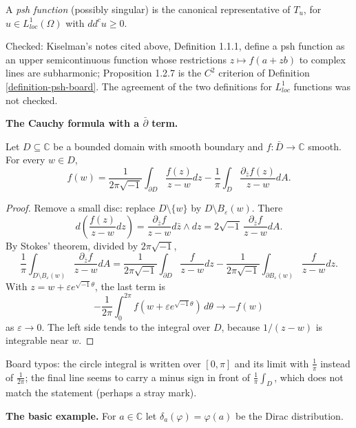 \begin{definition}
\label{definition-singular-psh}
A \emph{psh function} (possibly singular) is
the canonical representative of $T_u$, for
$u\in L^1_{loc}(\Omega)$ with $dd^cu\geq 0$.
\end{definition}

\noindent
Checked: Kiselman's notes cited above,
Definition 1.1.1, define a psh function as
an upper semicontinuous function whose
restrictions $z\mapsto f(a+zb)$ to complex
lines are subharmonic; Proposition 1.2.7 is
the $C^2$ criterion of Definition
\ref{definition-psh-board}. The agreement of
the two definitions for $L^1_{loc}$
functions was not checked.

\medskip\noindent
{\bf The Cauchy formula with a
$\bar\partial$ term.}

\begin{proposition}
\label{proposition-cauchy-pompeiu-board}
Let $D\subseteq\mathbb{C}$ be a bounded
domain with smooth boundary and $f\colon\bar
D\to\mathbb{C}$ smooth. For every $w\in D$,
$$
f(w)=\frac{1}{2\pi\sqrt{-1}}
\int_{\partial D}\frac{f(z)}{z-w}dz
-\frac{1}{\pi}\int_D
\frac{\partial_{\bar z}f(z)}{z-w}dA.
$$
\end{proposition}

\begin{proof}
Remove a small disc: replace
$D\setminus\{w\}$ by
$D\setminus B_\varepsilon(w)$. There
$$
d\left(\frac{f(z)}{z-w}dz\right)
=\frac{\partial_{\bar z}f}{z-w}
d\bar z\wedge dz
=2\sqrt{-1}\,
\frac{\partial_{\bar z}f}{z-w}dA.
$$
By Stokes' theorem, divided by
$2\pi\sqrt{-1}$,
$$
\frac{1}{\pi}
\int_{D\setminus B_\varepsilon(w)}
\frac{\partial_{\bar z}f}{z-w}dA
=\frac{1}{2\pi\sqrt{-1}}
\int_{\partial D}\frac{f}{z-w}dz
-\frac{1}{2\pi\sqrt{-1}}
\int_{\partial B_\varepsilon(w)}
\frac{f}{z-w}dz.
$$
With $z=w+\varepsilon e^{\sqrt{-1}\theta}$,
the last term is
$$
-\frac{1}{2\pi}\int_0^{2\pi}
f(w+\varepsilon e^{\sqrt{-1}\theta})
\,d\theta
\longrightarrow -f(w)
$$
as $\varepsilon\to 0$. The left side tends
to the integral over $D$, because
$1/(z-w)$ is integrable near $w$.
\end{proof}

\noindent
Board typos: the circle integral is written
over $[0,\pi]$ and its limit with
$\frac{1}{\pi}$ instead of
$\frac{1}{2\pi}$; the final line seems to
carry a minus sign in front of
$\frac{1}{\pi}\int_D$, which does not match
the statement (perhaps a stray mark).

\medskip\noindent
{\bf The basic example.} For $a\in\mathbb{C}$
let $\delta_a(\varphi)=\varphi(a)$ be the
Dirac distribution.

